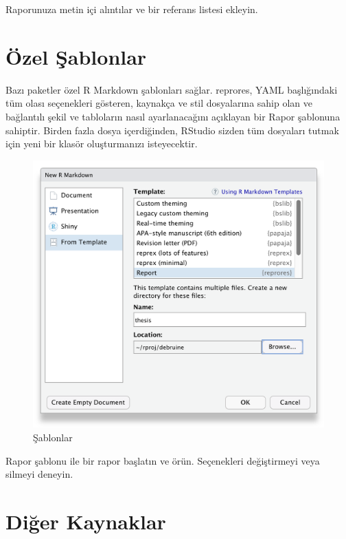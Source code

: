 \documentclass[
  oneside]{book}
\begin{document}
\begin{try}
Raporunuza metin içi alıntılar ve bir referans listesi ekleyin.

\end{try}

\hypertarget{uxf6zel-ux15fablonlar}{%
\section{Özel Şablonlar}\label{uxf6zel-ux15fablonlar}}

Bazı paketler özel R Markdown şablonları sağlar. reprores, YAML başlığındaki tüm olası seçenekleri gösteren, kaynakça ve stil dosyalarına sahip olan ve bağlantılı şekil ve tabloların nasıl ayarlanacağını açıklayan bir Rapor şablonuna sahiptir. Birden fazla dosya içerdiğinden, RStudio sizden tüm dosyaları tutmak için yeni bir klasör oluşturmanızı isteyecektir.

\begin{figure}

{\centering \includegraphics[width=0.75\linewidth]{images/custom-rmd} 

}

\caption{Şablonlar}\label{fig:img-custom-rmd}
\end{figure}

\begin{try}
Rapor şablonu ile bir rapor başlatın ve örün. Seçenekleri değiştirmeyi veya silmeyi deneyin.

\end{try}

\hypertarget{diux11fer-kaynaklar}{%
\section{Diğer Kaynaklar}\label{diux11fer-kaynaklar}}
\end{document}
